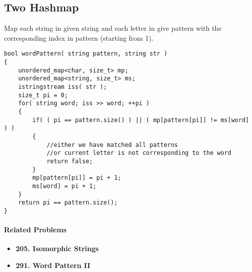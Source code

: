 \subsection{Two Hashmap}
Map each string in given string and each letter in give pattern with the corresponding index in pattern (starting from 1). 

\begin{lstlisting}[style=customc, caption={Two Hashmaps}]
bool wordPattern( string pattern, string str )
{
    unordered_map<char, size_t> mp;
    unordered_map<string, size_t> ms;
    istringstream iss( str );
    size_t pi = 0;
    for( string word; iss >> word; ++pi )
    {
        if( ( pi == pattern.size() ) || ( mp[pattern[pi]] != ms[word] ) )
        {
            //either we have matched all patterns
            //or current letter is not corresponding to the word
            return false;
        }
        mp[pattern[pi]] = pi + 1;
        ms[word] = pi + 1;
    }
    return pi == pattern.size();
}
\end{lstlisting}

\paragraph{Related Problems}
\begin{itemize}
\item \textbf{205. Isomorphic Strings}
\item \textbf{291. Word Pattern II}
\end{itemize}
